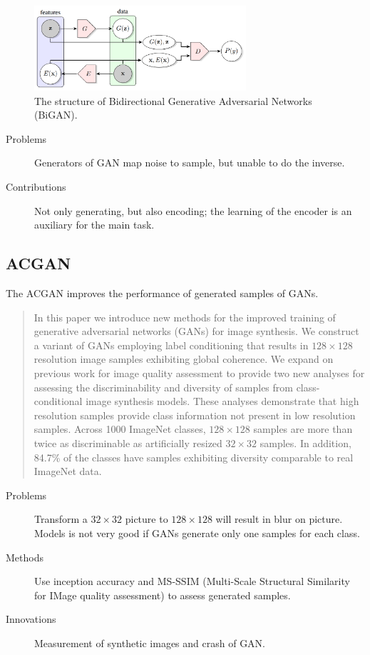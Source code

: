 \documentclass[12pt]{utils/mydoc}
\begin{document}
\begin{figure}[htb]
  \centering
  \includegraphics[width=0.7\textwidth]{figss/ali.png}
  \caption{The structure of Bidirectional Generative Adversarial Networks (BiGAN).}
  \label{fig:}
\end{figure}

\begin{description}
  \item[Problems] Generators of GAN map noise to sample, but unable to do the inverse.
  \item[Contributions] Not only generating, but also encoding; the learning of the
    encoder is an auxiliary for the main task.
\end{description}

\subsection{ACGAN}

The ACGAN\cite{odena2017conditional} improves the performance of generated samples of GANs.

\begin{abstract}
  In this paper we introduce new methods for the improved training of generative 
  adversarial networks (GANs) for image synthesis. We construct a variant of GANs
  employing label conditioning that results in $128 \times 128$ resolution image samples
  exhibiting global coherence. We expand on previous work for image quality 
  assessment to provide two new analyses for assessing the discriminability and 
  diversity of samples from class-conditional image synthesis models.  These 
  analyses demonstrate that high resolution samples provide class information 
  not present in low resolution samples. Across 1000 ImageNet classes, $128 \times 128$
  samples are more than twice as discriminable as artificially resized $32 \times 32$
  samples. In addition, 84.7\% of the classes have samples exhibiting diversity 
  comparable to real ImageNet data.
\end{abstract}

\begin{description}
  \item[Problems] Transform a $32 \times 32$ picture to $128 \times 128$ will result in
    blur on picture. Models is not very good if GANs generate only one samples for each
    class.
  \item[Methods] Use inception accuracy and MS-SSIM (Multi-Scale Structural Similarity
    for IMage quality assessment) to assess generated samples.
  \item[Innovations] Measurement of synthetic images and crash of GAN.
\end{description}
\end{document}
